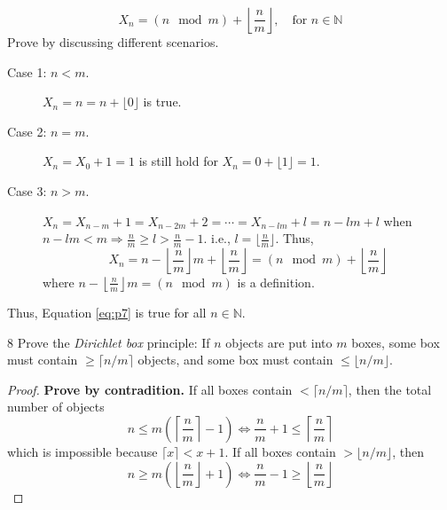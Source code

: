 \documentclass[a4paper,12pt]{article}
\makeatletter
\newtheorem*{solution}{Solution}
\theoremstyle{definition}
\renewenvironment{solution}[1][Solution] {\par\pushQED{\qed}\normalfont\topsep6\p@\@plus6\p@\relax\trivlist\item[\hskip\labelsep\bfseries#1\@addpunct{.}]\ignorespaces}{\popQED\endtrivlist\@endpefalse} \makeatother
\newenvironment{problems}{\begin{list}{}{\renewcommand{\makelabel}[1]{\textbf{##1}\hfil}}}{\end{list}}
\makeatother
\begin{document}
\begin{problems}
\begin{solution}
\begin{equation}
            X_n = (n\mod{m}) + \left\lfloor \frac{n}{m}\right\rfloor,\quad\text{for }n\in \mathbb{N}
        \end{equation}
        Prove by discussing different scenarios.
        \begin{description}
            \item[Case 1: $n<m$.] $X_{n}=n=n+\lfloor0\rfloor$ is true.
            \item[Case 2: $n=m$.] $X_{n}=X_0+1=1$ is still hold for $X_{n}=0 + \lfloor 1\rfloor=1$.
            \item[Case 3: $n>m$.] $X_{n}=X_{n-m}+1=X_{n-2m}+2=\cdots=X_{n-lm}+l=n-lm+l$ when $n-lm<m\Rightarrow \frac{n}{m} \geq l>\frac{n}{m}-1$. i.e., $l=\lfloor \frac{n}{m}\rfloor$. Thus, 
            \begin{equation*}
                X_n = n - \left\lfloor \frac{n}{m}\right\rfloor m + \left\lfloor \frac{n}{m}\right\rfloor = (n\mod{m}) + \left\lfloor \frac{n}{m}\right\rfloor
            \end{equation*}
            where $ n - \left\lfloor \frac{n}{m}\right\rfloor m=(n\mod{m})$ is a definition.
        \end{description}
        Thus, Equation \eqref{eq:p7} is true for all $n\in \mathbb{N}$.
    \end{solution}
    \item[8] Prove the \emph{Dirichlet box} principle:  If $n$ objects are put into $m$ boxes, some box must contain $\geq \lceil n/m\rceil$ objects, and some box must contain $\leq \lfloor n/m\rfloor$.
    \begin{proof}
        \textbf{Prove by contradition.} If all boxes contain $< \lceil n/m \rceil$, then the total number of objects
        \begin{equation*}
            n \leq m\left(\left\lceil \frac{n}{m} \right\rceil - 1\right) \Leftrightarrow \frac{n}{m} + 1\leq \left\lceil \frac{n}{m} \right\rceil
        \end{equation*} 
        which is impossible because $\lceil x\rceil<x+1$.
        If all boxes contain $>\lfloor n/m \rfloor$, then
        \begin{equation*}
            n \geq m\left(\left\lfloor \frac{n}{m} \right\rfloor + 1\right) \Leftrightarrow \frac{n}{m} - 1 \geq \left\lfloor \frac{n}{m} \right\rfloor
        \end{equation*}

\end{proof}
\end{problems}
\end{document}
